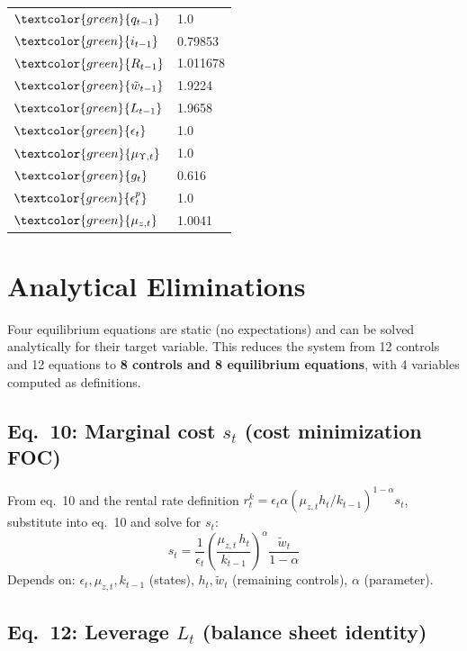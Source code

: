 \begin{table}[ht]
\begin{minipage}[b]{0.45\linewidth}
\begin{tabular}{ll}
$\textcolor{green}{q_{t-1}}$ & 1.0 \\
$\textcolor{green}{i_{t-1}}$ & 0.79853 \\
$\textcolor{green}{R_{t-1}}$ & 1.011678 \\
$\textcolor{green}{\tilde{w}_{t-1}}$ & 1.9224 \\
$\textcolor{green}{L_{t-1}}$ & 1.9658 \\
$\textcolor{green}{\epsilon_t}$ & 1.0 \\
$\textcolor{green}{\mu_{\Upsilon,t}}$ & 1.0  \\
$\textcolor{green}{g_t}$ &  0.616  \\
$\textcolor{green}{\epsilon_t^p}$ & 1.0  \\
$\textcolor{green}{\mu_{z,t}}$ &  1.0041 \\
\bottomrule
\end{tabular}
\end{minipage}
\end{table}


 \FloatBarrier


\newpage

\section{Analytical Eliminations}

Four equilibrium equations are static (no expectations) and can be solved
analytically for their target variable. This reduces the system from 12 controls
and 12 equations to \textbf{8 controls and 8 equilibrium equations}, with 4
variables computed as definitions.

\subsection*{Eq.~10: Marginal cost $s_t$ (cost minimization FOC)}

From eq.~10 and the rental rate definition $r_t^k = \epsilon_t \alpha
(\mu_{z,t} h_t / k_{t-1})^{1-\alpha} s_t$, substitute into eq.~10 and solve for $s_t$:
\begin{equation*}
  \boxed{s_t = \frac{1}{\epsilon_t}
    \left(\frac{\mu_{z,t}\, h_t}{k_{t-1}}\right)^{\!\alpha}
    \frac{\tilde{w}_t}{1-\alpha}}
\end{equation*}
Depends on: $\epsilon_t, \mu_{z,t}, k_{t-1}$ (states), $h_t, \tilde{w}_t$ (remaining controls), $\alpha$ (parameter).

\subsection*{Eq.~12: Leverage $L_t$ (balance sheet identity)}

